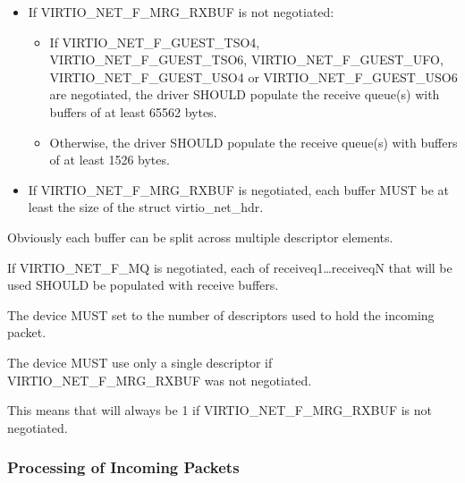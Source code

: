 
\begin{itemize}
\item If VIRTIO_NET_F_MRG_RXBUF is not negotiated:
  \begin{itemize}
    \item If VIRTIO_NET_F_GUEST_TSO4, VIRTIO_NET_F_GUEST_TSO6, VIRTIO_NET_F_GUEST_UFO,
	VIRTIO_NET_F_GUEST_USO4 or VIRTIO_NET_F_GUEST_USO6 are negotiated, the driver SHOULD populate
      the receive queue(s) with buffers of at least 65562 bytes.
    \item Otherwise, the driver SHOULD populate the receive queue(s)
      with buffers of at least 1526 bytes.
  \end{itemize}
\item If VIRTIO_NET_F_MRG_RXBUF is negotiated, each buffer MUST be at
least the size of the struct virtio_net_hdr.
\end{itemize}

\begin{note}
Obviously each buffer can be split across multiple descriptor elements.
\end{note}

If VIRTIO_NET_F_MQ is negotiated, each of receiveq1\ldots receiveqN
that will be used SHOULD be populated with receive buffers.


The device MUST set  to the number of descriptors used to
hold the incoming packet.

The device MUST use only a single descriptor if VIRTIO_NET_F_MRG_RXBUF
was not negotiated.
\begin{note}
{This means that  will always be 1
if VIRTIO_NET_F_MRG_RXBUF is not negotiated.}
\end{note}

\subsubsection{Processing of Incoming Packets}\label{sec:Device Types / Network Device / Device Operation / Processing of Incoming Packets}
\label{sec:Device Types / Network Device / Device Operation / Processing of Packets}%

